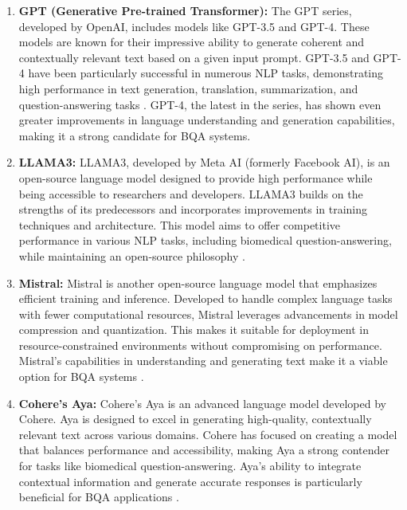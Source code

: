 \documentclass[onecolumn, conference]{IEEEtran}
\begin{document}
\begin{enumerate}
  \item \textbf{GPT (Generative Pre-trained Transformer):} The GPT series, developed by OpenAI, includes models like GPT-3.5 and GPT-4. These models are known for their impressive ability to generate coherent and contextually relevant text based on a given input prompt. GPT-3.5 and GPT-4 have been particularly successful in numerous NLP tasks, demonstrating high performance in text generation, translation, summarization, and question-answering tasks \cite{openai2024gpt4}. GPT-4, the latest in the series, has shown even greater improvements in language understanding and generation capabilities, making it a strong candidate for BQA systems.

  \item \textbf{LLAMA3:} LLAMA3, developed by Meta AI (formerly Facebook AI), is an open-source language model designed to provide high performance while being accessible to researchers and developers. LLAMA3 builds on the strengths of its predecessors and incorporates improvements in training techniques and architecture. This model aims to offer competitive performance in various NLP tasks, including biomedical question-answering, while maintaining an open-source philosophy \cite{touvron2023llama}.

  \item \textbf{Mistral:} Mistral is another open-source language model that emphasizes efficient training and inference. Developed to handle complex language tasks with fewer computational resources, Mistral leverages advancements in model compression and quantization. This makes it suitable for deployment in resource-constrained environments without compromising on performance. Mistral's capabilities in understanding and generating text make it a viable option for BQA systems \cite{jiang2023mistral}.

  \item \textbf{Cohere's Aya:} Cohere's Aya is an advanced language model developed by Cohere. Aya is designed to excel in generating high-quality, contextually relevant text across various domains. Cohere has focused on creating a model that balances performance and accessibility, making Aya a strong contender for tasks like biomedical question-answering. Aya's ability to integrate contextual information and generate accurate responses is particularly beneficial for BQA applications \cite{cohere2023aya}.
\end{enumerate}
\end{document}
